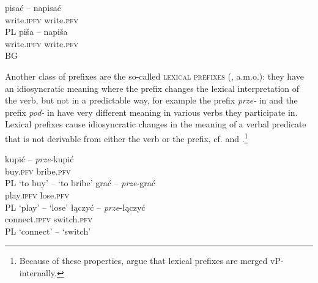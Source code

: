 \documentclass[output=paper,colorlinks,citecolor=brown]{langscibook}
\begin{document}
\ea\label{basics:perfective}
\ea  \gll pisać --  napisać  \\
 write.\textsc{ipfv}  {} write.\textsc{pfv} \\ \hfill PL
\ex \gll  piša -- napiša   \\
write.\textsc{ipfv} {} write.\textsc{pfv} \\ \hfill BG
\z %
\z %




\noindent Another class of prefixes are the so-called \textsc{lexical prefixes} (\citealt{babko1999,svenonius2004b,kli+:svenonius2004a,kli+:romanova2004,romanova2007,kli+:ramchand2008a,ramchand2008b,biskup2012,kli+:biskup2019}, a.m.o.): they have an idiosyncratic meaning where the prefix changes the lexical interpretation of the verb, but not in a predictable way, for example the prefix \textit{prze-} in  and the prefix \textit{pod-} in  have very different meaning in various verbs they participate in.  
Lexical prefixes cause idiosyncratic changes in the meaning of a verbal predicate that is not derivable from either the verb or the prefix, cf.  and .\footnote{Because of these properties, \citet{kli+:romanova2004,svenonius2004b,kli+:svenonius2004a,kli+:ramchand2004,kli+:ramchand2008a,ramchand2008b,lazorczyk2010} argue that lexical prefixes are merged vP-internally.}

\ea\label{basics:idiosyncratic:PL} 
\ea
\gll kupić -- \textit{prze}-kupić  \\
buy.\textsc{pfv} {} bribe.\textsc{pfv} \\  \hfill PL
\glt`to buy’ -- `to bribe’
%
\ex \gll grać -- \textit{prze}-grać\\
play.\textsc{ipfv} {} lose.\textsc{pfv} \\ \hfill PL
\glt `play' -- `lose'
%
\ex \gll łączyć -- \textit{prze}-łączyć\\
connect.\textsc{ipfv} {} switch.\textsc{pfv} \\\hfill PL
\glt `connect' -- `switch'\\ 
\z
\z
\end{document}
